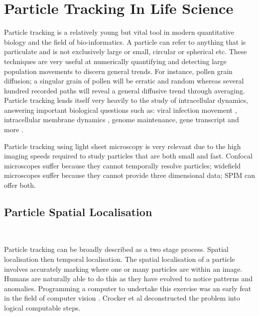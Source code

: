 

\section{Particle Tracking In Life Science}


Particle tracking is a relatively young but vital tool in modern quantitative biology and the field of bio-informatics. A particle can refer to anything that is particulate and is not exclusively large or small, circular or spherical etc. These techniques are very useful at numerically quantifying and detecting large population movements to discern general trends. For instance, pollen grain diffusion; a singular grain of pollen will be erratic and random whereas several hundred recorded paths will reveal a general diffusive trend through averaging. Particle tracking lends itself very heavily to the study of intracellular dynamics, answering important biological questions such as: viral infection movement \cite{Brandenburg2007}, intracellular membrane dynamics \cite{Chenouard2014}, genome maintenance, gene transcript \cite{Planchon2011} and more \cite{Cognet2014}.

Particle tracking using light sheet microscopy is very relevant due to the high imaging speeds required to study particles that are both small and fast. Confocal microscopes suffer because they cannot temporally resolve particles; widefield microscopes suffer because they cannot provide three dimensional data; SPIM can offer both.

\subsection{Particle Spatial Localisation}~

Particle tracking can be broadly described as a two stage process. Spatial localisation then temporal localisation. The spatial localisation of a particle involves accurately marking where one or many particles are within an image. Humans are naturally able to do this as they have evolved to notice patterns and anomalies. Programming a computer to undertake this exercise was an early feat in the field of computer vision \cite{Crocker1996}. Crocker et al deconstructed the problem into logical computable steps.

